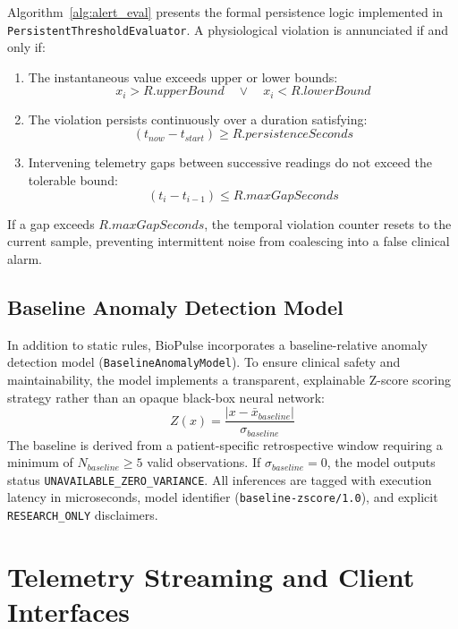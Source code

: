 \documentclass[10pt,journal,compsoc]{IEEEtran}
\begin{document}
Algorithm~\ref{alg:alert_eval} presents the formal persistence logic implemented in \texttt{PersistentThresholdEvaluator}. A physiological violation is annunciated if and only if:
\begin{enumerate}
    \item The instantaneous value exceeds upper or lower bounds:
    \begin{equation}
    x_i > R.upperBound \quad \lor \quad x_i < R.lowerBound
    \end{equation}
    \item The violation persists continuously over a duration satisfying:
    \begin{equation}
    (t_{now} - t_{start}) \ge R.persistenceSeconds
    \end{equation}
    \item Intervening telemetry gaps between successive readings do not exceed the tolerable bound:
    \begin{equation}
    (t_i - t_{i-1}) \le R.maxGapSeconds
    \end{equation}
\end{enumerate}
If a gap exceeds $R.maxGapSeconds$, the temporal violation counter resets to the current sample, preventing intermittent noise from coalescing into a false clinical alarm.

\subsection{Baseline Anomaly Detection Model}
In addition to static rules, BioPulse incorporates a baseline-relative anomaly detection model (\texttt{BaselineAnomalyModel}). To ensure clinical safety and maintainability, the model implements a transparent, explainable Z-score scoring strategy rather than an opaque black-box neural network:
\begin{equation}
Z(x) = \frac{|x - \bar{x}_{baseline}|}{\sigma_{baseline}}
\end{equation}
The baseline is derived from a patient-specific retrospective window requiring a minimum of $N_{baseline} \ge 5$ valid observations. If $\sigma_{baseline} = 0$, the model outputs status \texttt{UNAVAILABLE\_ZERO\_VARIANCE}. All inferences are tagged with execution latency in microseconds, model identifier (\texttt{baseline-zscore/1.0}), and explicit \texttt{RESEARCH\_ONLY} disclaimers.

\section{Telemetry Streaming and Client Interfaces}
\label{sec:telemetry}
\end{document}
